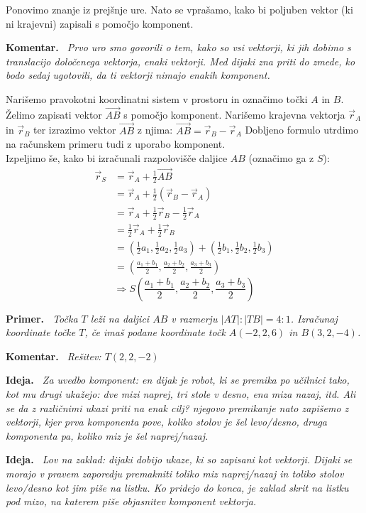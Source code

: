 \documentclass[a4paper,11pt]{article}
\newenvironment{ide}{%
  \par\medskip\noindent\textbf{Ideja.}\itshape\ }{\par\medskip}
\newenvironment{komentar}{%
  \par\medskip\noindent\textbf{Komentar.}\itshape\ }{\par\medskip}
\newenvironment{primer}{%
  \par\medskip\noindent\textbf{Primer.}\itshape\ }{\par\medskip}
\begin{document}
Ponovimo znanje iz prejšnje ure. Nato se vprašamo, kako bi poljuben vektor (ki ni krajevni) zapisali s pomočjo komponent.
\begin{komentar}
    Prvo uro smo govorili o tem, kako so vsi vektorji, ki jih dobimo s translacijo določenega vektorja, enaki vektorji. Med dijaki zna priti do zmede, ko bodo sedaj ugotovili, da ti vektorji nimajo enakih komponent.
\end{komentar}



Narišemo pravokotni koordinatni sistem v prostoru in označimo točki $A$ in $B$. Želimo zapisati vektor $\vec{AB}$ s pomočjo komponent. Narišemo krajevna vektorja $\vec{r}_A$ in $\vec{r}_B$ ter izrazimo vektor $\vec{AB}$ z njima: $\vec{AB}=\vec{r}_B-\vec{r}_A$
Dobljeno formulo utrdimo na računskem primeru tudi z uporabo komponent.\\

Izpeljimo še, kako bi izračunali razpolovišče daljice $AB$ (označimo ga z $S$):
\begin{align*}
\vec{r}_S
    &= \vec{r}_A+\frac{1}{2}\vec{AB} \\
    &= \vec{r}_A+\frac{1}{2}\left(\vec{r}_B-\vec{r}_A\right) \\
    &= \vec{r}_A+\frac{1}{2}\vec{r}_B-\frac{1}{2}\vec{r}_A \\
    &= \frac{1}{2}\vec{r}_A+\frac{1}{2}\vec{r}_B \\
    &= (\frac{1}{2}a_1,\frac{1}{2}a_2,\frac{1}{2}a_3)+(\frac{1}{2}b_1,\frac{1}{2}b_2,\frac{1}{2}b_3)\\
    &= (\frac{a_1+b_1}{2},\frac{a_2+b_2}{2},\frac{a_3+b_3}{2})
\end{align*}
$$\Rightarrow S(\frac{a_1+b_1}{2},\frac{a_2+b_2}{2},\frac{a_3+b_3}{2})$$


\begin{primer}
    Točka $T$ leži na daljici $AB$ v razmerju $|AT|:|TB|=4:1$. Izračunaj koordinate točke $T$, če imaš podane koordinate točk $A(-2,2,6)$ in $B(3,2,-4)$.
\end{primer}
\begin{komentar}
    Rešitev: $T(2,2,-2)$
\end{komentar}

\begin{ide}
    Za uvedbo komponent:
    en dijak je robot, ki se premika po učilnici tako, kot mu drugi ukažejo: dve mizi naprej, tri stole v desno, ena miza nazaj, itd.  Ali se da z različnimi ukazi priti na enak cilj? njegovo premikanje nato zapišemo z vektorji, kjer prva komponenta pove, koliko stolov je šel levo/desno, druga komponenta pa, koliko miz je šel naprej/nazaj.
\end{ide}
\begin{ide}
Lov na zaklad:
    dijaki dobijo ukaze, ki so zapisani kot vektorji. Dijaki se morajo v pravem zaporedju premakniti toliko miz naprej/nazaj in toliko stolov levo/desno kot jim piše na listku. Ko pridejo do konca, je zaklad skrit na listku pod mizo, na katerem piše objasnitev komponent vektorja.
\end{ide}
\end{document}
